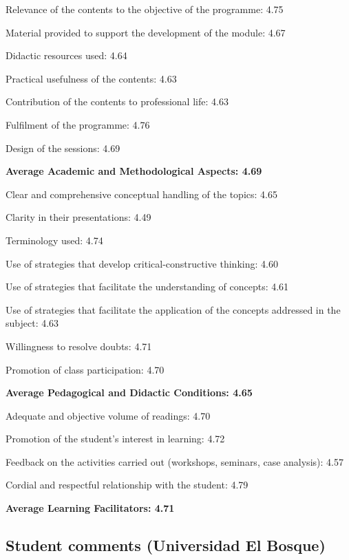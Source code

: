 \documentclass[11pt, a4paper]{awesome-cv}
\begin{document}
\begin{cventries}
{\begin{cvitems}
\item Relevance of the contents to the objective of the programme: 4.75
\item Material provided to support the development of the module: 4.67
\item Didactic resources used: 4.64
\item Practical usefulness of the contents: 4.63
\item Contribution of the contents to professional life: 4.63
\item Fulfilment of the programme: 4.76
\item Design of the sessions: 4.69
\item \textbf{ Average Academic and Methodological Aspects: 4.69}
\item Clear and comprehensive conceptual handling of the topics: 4.65
\item Clarity in their presentations: 4.49
\item Terminology used: 4.74
\item Use of strategies that develop critical-constructive thinking: 4.60
\item Use of strategies that facilitate the understanding of concepts: 4.61
\item Use of strategies that facilitate the application of the concepts addressed in the subject: 4.63
\item Willingness to resolve doubts: 4.71
\item Promotion of class participation: 4.70
\item \textbf{ Average Pedagogical and Didactic Conditions: 4.65}
\item Adequate and objective volume of readings: 4.70
\item Promotion of the student's interest in learning: 4.72
\item Feedback on the activities carried out (workshops, seminars, case analysis): 4.57
\item Cordial and respectful relationship with the student: 4.79
\item \textbf{Average Learning Facilitators: 4.71}
\end{cvitems}}
\end{cventries}

\hypertarget{universidad-el-bosque-1}{%
\subsection{\texorpdfstring{\textbf{Student comments} (Universidad El
Bosque)}{ (Universidad El Bosque)}}\label{universidad-el-bosque-1}}
\end{document}
